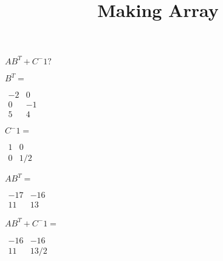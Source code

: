\documentclass[10pt,a4paper]{article}
\title{Making Array}
\begin{document}
$AB^T+C^-1?$


$B^T=$

$\begin{array}{cc}
-2 & 0 \\ 
0 & -1 \\ 
5 & 4
\end{array} $



$C^-1=$

$\begin{array}{cc}
1 & 0 \\ 
0 & 1/2
\end{array} $



$AB^T=$


$\begin{array}{cc}
-17 & -16 \\ 
11 & 13
\end{array} $



$AB^T+C^-1=$




$\begin{array}{cc}
-16 & -16 \\ 
11 & 13/2
\end{array} $
\end{document}
